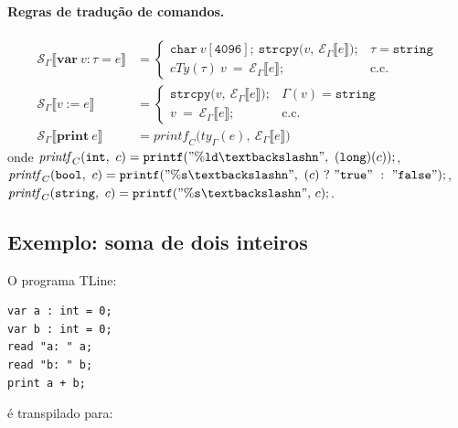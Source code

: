 \paragraph{Regras de tradução de comandos.}

\begin{Definition}\label{def:tline-stmt}
\begin{align*}
\mathcal{S}_\Gamma\llbracket \mathbf{var}\ v : \tau = e \rrbracket
  &= \begin{cases}
       \mathtt{char\ }v\mathtt{[4096];\ strcpy(}v\mathtt{,\ }\mathcal{E}_\Gamma\llbracket e\rrbracket\mathtt{);}
         & \tau = \mathtt{string} \\
       \mathit{cTy}(\tau)\ v\ \mathtt{=}\ \mathcal{E}_\Gamma\llbracket e\rrbracket\mathtt{;}
         & \text{c.c.}
     \end{cases} \\[6pt]
\mathcal{S}_\Gamma\llbracket v \mathrel{:=} e \rrbracket
  &= \begin{cases}
       \mathtt{strcpy(}v\mathtt{,\ }\mathcal{E}_\Gamma\llbracket e\rrbracket\mathtt{);}
         & \Gamma(v) = \mathtt{string} \\
       v\ \mathtt{=}\ \mathcal{E}_\Gamma\llbracket e\rrbracket\mathtt{;}
         & \text{c.c.}
     \end{cases} \\[6pt]
\mathcal{S}_\Gamma\llbracket \mathbf{print}\ e \rrbracket
  &= \mathit{printf}_C\bigl(\mathit{ty}_\Gamma(e),\ \mathcal{E}_\Gamma\llbracket e\rrbracket\bigr)
\end{align*}
onde $\mathit{printf}_C(\mathtt{int},\ c) = \mathtt{printf("\%ld\textbackslash n",\ (long)(}c\mathtt{));}$,
$\mathit{printf}_C(\mathtt{bool},\ c) = \mathtt{printf("\%s\textbackslash n",\ (}c\mathtt{)\ ?\ "true"\ :\ "false");}$,
$\mathit{printf}_C(\mathtt{string},\ c) = \mathtt{printf("\%s\textbackslash n",\ }c\mathtt{);}$.
\end{Definition}

\subsection{Exemplo: soma de dois inteiros}

O programa TLine:
\begin{verbatim}
var a : int = 0;
var b : int = 0;
read "a: " a;
read "b: " b;
print a + b;
\end{verbatim}

é transpilado para:


